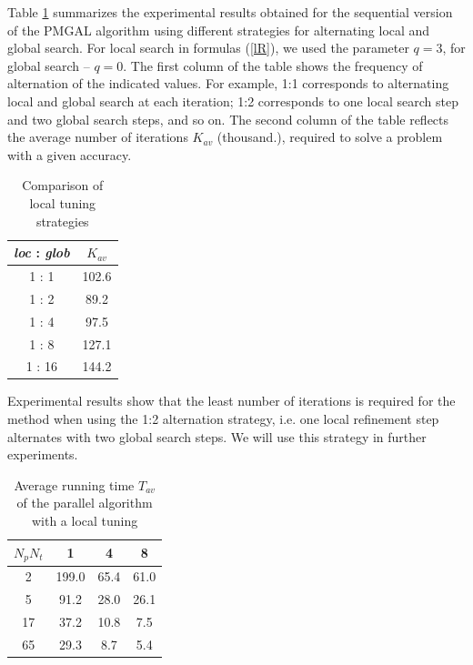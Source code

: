 \documentclass[
11pt,%
tightenlines,%
twoside,%
onecolumn,%
nofloats,%
nobibnotes,%
nofootinbib,%
superscriptaddress,%
noshowpacs,%
centertags]%
{revtex4}
\begin{document}
Table \ref{tab:2} summarizes the experimental results obtained for the sequential version of the PMGAL algorithm using different strategies for alternating local and global search. For local search in formulas  (\ref{lR}), we used the parameter $q=3$, for global search -- $q=0$. The first column of the table shows the frequency of alternation of the indicated values. For example, 1:1 corresponds to alternating local and global search at each iteration; 1:2 corresponds to one local search step and two global search steps, and so on. The second column of the table reflects the average number of iterations  $K_{av}$ (thousand.), required to solve a problem with a given accuracy.

\begin{table}
	\caption{Comparison of local tuning strategies}
	\label{tab:2}
	\center
	\begin{tabular}{|c|c|}
		\hline		
		\textit{loc} : \textit{glob} & $K_{av}$   \\
		\hline 
		1 : 1 & 102.6\\
		1 : 2 & 89.2\\
		1 : 4 & 97.5\\
		1 : 8 & 127.1\\
		1 : 16 & 144.2\\
		\hline
	\end{tabular}
\end{table}	


Experimental results show that the least number of iterations is required for the method when using the 1:2 alternation strategy, i.e. one local refinement step alternates with two global search steps. We will use this strategy in further experiments.

\begin{table}
	\caption{Average running time $T_{av}$ of the parallel algorithm with a local tuning}
	\label{tab:3}
	\center
	\begin{tabular}{|c|c|c|c|}
		\hline	
	\diaghead{\theadfont Diag Column} { $N_{p}$}{$N_{t}$} & 1 & 4 & 8\\
	
		\hline		
		2  & 199.0 & 65.4 & 61.0  \\
		5  & 91.2 & 28.0 &  26.1 \\
		17  & 37.2 & 10.8 & 7.5 \\
		65  & 29.3 & 8.7 & 5.4 \\
		\hline
	\end{tabular}
\end{table}	
\end{document}
